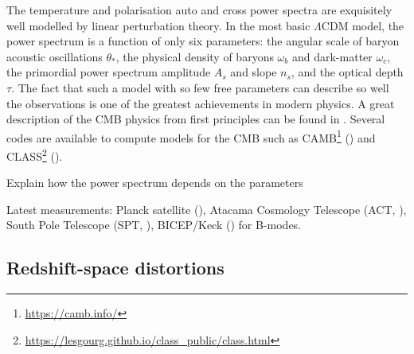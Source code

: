     The temperature and polarisation auto and cross power spectra 
    are exquisitely well modelled by linear perturbation theory. 
    In the most basic $\Lambda$CDM model, the power spectrum is a 
    function of only six parameters: the angular scale of baryon 
    acoustic oscillations $\theta_*$, 
    the physical density of baryons $\omega_b$ and dark-matter $\omega_c$, 
    the primordial power spectrum amplitude $A_s$ and slope $n_s$, 
    and the optical depth $\tau$. 
    The fact that such a model with so few free parameters can 
    describe so well the observations is one of the greatest achievements 
    in modern physics. A great description of the CMB physics 
    from first principles can be found in \cite{dodelsonscottModernCosmology2nd2020}.
    Several codes are available to compute models for the CMB 
    such as \textsc{CAMB}\footnote{\url{https://camb.info/}} 
    (\cite{lewisEfficientComputationCosmic2000})
    and \textsc{CLASS}\footnote{\url{https://lesgourg.github.io/class_public/class.html}} 
    (\cite{lesgourguesCosmicLinearAnisotropy2011}). 
    
    Explain how the power spectrum depends on the parameters
    
    Latest measurements: 
    Planck satellite (\cite{planckcollaborationPlanck2018Results2020}), 
    Atacama Cosmology Telescope (ACT, \cite{aiolaAtacamaCosmologyTelescope2020}), 
    South Pole Telescope (SPT, \cite{aylorComparisonCosmologicalParameters2017, 
    balkenholConstraintsLambdaCDM2021, 
    dutcherMeasurementsEModePolarization2021}),
    BICEP/Keck (\cite{bicep/keckDemonstrationImprovedConstraints2021}) for B-modes. 
    




 

    \subsection{Redshift-space distortions}
    \label{intro:probes:rsd}

